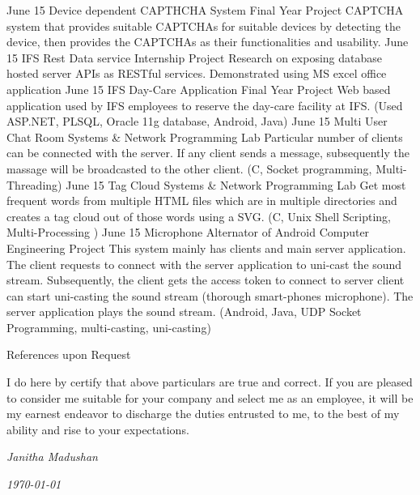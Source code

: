 \documentclass[]{cv-class}
\begin{document}
\begin{entrylist}
	\entry
    {June 15}
    {Device dependent CAPTHCHA System}
    {Final Year Project}
    {CAPTCHA system that provides suitable CAPTCHAs for suitable devices
	by  detecting  the  device,  then  provides  the  CAPTCHAs  as  their 
	functionalities and usability.}
  \entry
    {June 15}
    {IFS Rest Data service}
    {Internship Project}
    {Research on exposing database hosted server  APIs  as  RESTful  services. 
	Demonstrated  using  MS  excel  office  application}
  \entry
    {June 15}
    {IFS Day-Care Application}
    {Final Year Project}
    {Web  based  application  used  by  IFS  employees  to  reserve  the  day-care 
	facility at IFS. (Used ASP.NET, PLSQL, Oracle 11g database, Android, 
	Java)}  
  \entry
    {June 15}
    {Multi User Chat Room}
    {Systems \& Network Programming Lab}
    {Particular number of clients can be connected with the server. If any 
	client  sends  a  message, subsequently  the  massage  will be broadcasted to the other client. 
	(C, Socket programming, Multi-Threading)}
  \entry
    {June 15}
    {Tag Cloud}
    {Systems \& Network Programming Lab}
    {Get most frequent words from multiple HTML files which are in 
	multiple directories and creates a tag cloud out of those words using a 
	SVG. (C, Unix Shell Scripting, Multi-Processing )}
  \entry
    {June 15}
    {Microphone Alternator of Android}
    {Computer Engineering Project}
    {This system mainly has clients and main server application. The client requests to connect with the server application to 			uni-cast the sound stream. Subsequently, the client gets the access token to connect to server client can start uni-casting 			the sound stream (thorough smart-phones microphone). The server application plays the sound stream.  
    (Android, Java, UDP Socket Programming, multi-casting, uni-casting)}
\end{entrylist}

\vspace{3cm}

\begin{entrylist}
  \entry
    {}
    {}
    {}
    {References upon Request}
\end{entrylist}

\begin{entrylist}
  \entry
    {}
    {}
    {}
    {I do here by certify that above particulars are true and correct. If you are pleased to consider me 
	suitable for your company and select me as an employee, it will be my earnest endeavor to discharge 
	the duties entrusted to me, to the best of my ability and rise to your expectations.}
\end{entrylist}

\begin{flushright}
\emph{Janitha Madushan}
\end{flushright}
\begin{flushright}
\emph{\today}
\end{flushright}
\end{document}
